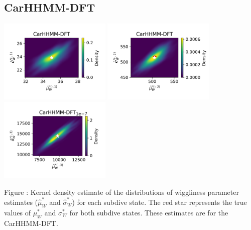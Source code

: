\documentclass{article}
\begin{document}
        \newpage
    
        \subsection{CarHHMM-DFT}
        \begin{center}
        \includegraphics[width=2.1in]{../Plots/hhmm_FV_MLE_density_FoVeDBA_0_0.png}
        \includegraphics[width=2.1in]{../Plots/hhmm_FV_MLE_density_FoVeDBA_0_1.png}
        \includegraphics[width=2.1in]{../Plots/hhmm_FV_MLE_density_FoVeDBA_0_2.png}
        \end{center}
        
        \noindent Figure : Kernel density estimate of the distributions of wiggliness parameter estimates ($\hat \mu^*_W$ and $\hat \sigma^*_W$) for each subdive state. The red star represents the true values of $\mu^*_W$ and $\sigma^*_W$ for both subdive states. These estimates are for the CarHHMM-DFT.
        \addtocounter{fignum}{1}
        
\end{document}

